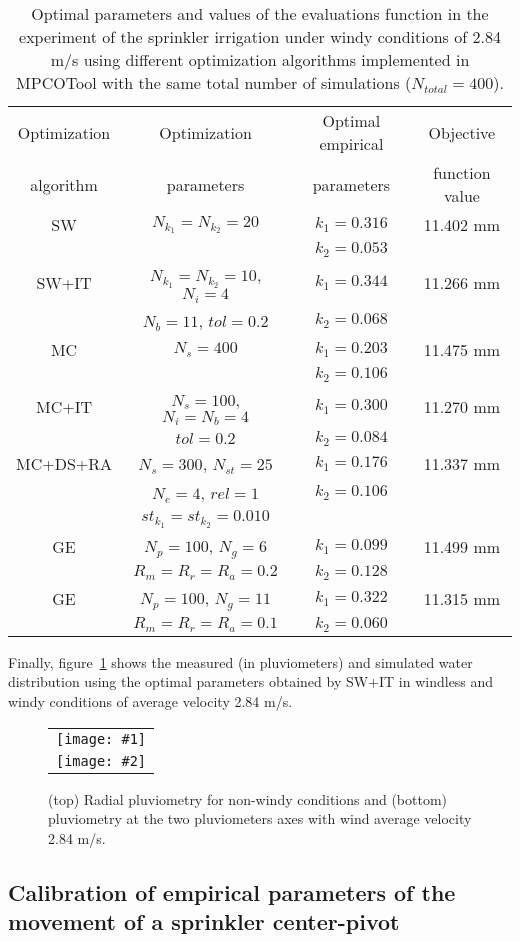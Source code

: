 \documentclass[review,authoryear]{elsarticle}
\newcommand{\TABLE}[5]
{
	\begin{table}[ht!]
		\centering
		\caption{#4.\label{#5}}
		#1
		\begin{tabular}{#2}
			#3
		\end{tabular}
	\end{table}
}
\newcommand{\FIGII}[4]
{
	\begin{figure}[ht!]
		\centering
		\begin{tabular}{c}
			\texttt{[image: \#1]} \\ \texttt{[image: \#2]}
		\end{tabular}
		\caption{#3.\label{#4}}
	\end{figure}
}
\begin{document}
\TABLE{\scriptsize}{cccc}
{
	Optimization & Optimization & Optimal empirical & Objective
	\\ algorithm & parameters & parameters & function value
	\\ \hline
	SW & $N_{k_1}=N_{k_2}=20$ & $k_1=0.316$ & 11.402 mm
	\\ & & $k_2=0.053$
	\\ \hline
	SW+IT & $N_{k_1}=N_{k_2}=10$, $N_i=4$ & $k_1=0.344$ & 11.266 mm
	\\ & $N_b=11$, $tol=0.2$ & $k_2=0.068$
	\\ \hline
	MC & $N_s=400$ & $k_1=0.203$ & 11.475 mm
	\\ & & $k_2=0.106$
	\\ \hline
	MC+IT & $N_s=100$, $N_i=N_b=4$ & $k_1=0.300$ & 11.270 mm
	\\ & $tol=0.2$ & $k_2=0.084$
	\\ \hline
	MC+DS+RA & $N_s=300$, $N_{st}=25$ & $k_1=0.176$ & 11.337 mm
	\\ & $N_e=4$, $rel=1$& $k_2=0.106$
	\\ & $st_{k_1}=st_{k_2}=0.010$
	\\ \hline
	GE & $N_p=100$, $N_g=6$ & $k_1=0.099$ & 11.499 mm
	\\ & $R_m=R_r=R_a=0.2$ & $k_2=0.128$
	\\ \hline
	GE & $N_p=100$, $N_g=11$ & $k_1=0.322$ & 11.315 mm
	\\ & $R_m=R_r=R_a=0.1$ & $k_2=0.060$
	\\ \hline
}{Optimal parameters and values of the evaluations function in the experiment of the sprinkler irrigation under windy conditions of 2.84 m/s using different optimization algorithms implemented in MPCOTool with the same total number of simulations ($N_{total}=400$)}{TabSprinklerII}

Finally, figure~\ref{FigSprinkler} shows the measured (in pluviometers) and simulated water distribution using the optimal parameters obtained by SW+IT in windless and windy conditions of average velocity 2.84 m/s.

\FIGII{sprinkler-0.eps}{sprinkler-2,84.eps}
{(top) Radial pluviometry for non-windy conditions and (bottom) pluviometry at
the two pluviometers axes with wind average velocity 2.84 m/s}{FigSprinkler}

\subsection{Calibration of empirical parameters of the movement of a
sprinkler center-pivot}
\end{document}
